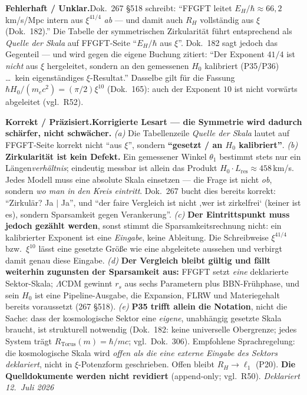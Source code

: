 \smallskip\noindent\textbf{Fehlerhaft / Unklar.}\quad Dok.~267 \S518 schreibt: \enquote{FFGFT leitet $E_H/\hbar \approx 66{,}2$\,km/s/Mpc intern aus $\xi^{41/4}$ \emph{ab} --- und damit auch $R_H$ vollständig aus $\xi$ (Dok.~182).} Die Tabelle der symmetrischen Zirkularität führt entsprechend als \emph{Quelle der Skala} auf FFGFT-Seite \enquote{$E_H/\hbar$ aus $\xi$}. Dok.~182 sagt jedoch das Gegenteil --- und wird gegen die eigene Buchung zitiert: \enquote{Der Exponent $41/4$ ist \emph{nicht} aus $\xi$ hergeleitet, sondern an den gemessenen $H_0$ kalibriert (P35/P36) \ldots\ kein eigenständiges $\xi$-Resultat.} Dasselbe gilt für die Fassung $\hbar H_0/(m_e c^2) = (\pi/2)\xi^{10}$ (Dok.~165): auch der Exponent $10$ ist nicht vorwärts abgeleitet (vgl.\ R52).


\smallskip\noindent\textbf{Korrekt / Präzisiert.}\quad \textbf{Korrigierte Lesart --- die Symmetrie wird dadurch schärfer, nicht schwächer.} \emph{(a)} Die Tabellenzeile \emph{Quelle der Skala} lautet auf FFGFT-Seite korrekt nicht \enquote{aus $\xi$}, sondern \textbf{\enquote{gesetzt / an $H_0$ kalibriert}}. \emph{(b)} \textbf{Zirkularität ist kein Defekt.} Ein gemessener Winkel $\theta_1$ bestimmt stets nur ein Längen\emph{verhältnis}; eindeutig messbar ist allein das Produkt $H_0\cdot L_\text{res} \approx 458$\,km/s. Jedes Modell muss eine absolute Skala einsetzen --- die Frage ist nicht \emph{ob}, sondern \emph{wo man in den Kreis eintritt}. Dok.~267 bucht dies bereits korrekt: \enquote{Zirkulär? Ja $|$ Ja}, und \enquote{der faire Vergleich ist nicht ,wer ist zirkelfrei` (keiner ist es), sondern Sparsamkeit gegen Verankerung}. \emph{(c)} \textbf{Der Eintrittspunkt muss jedoch gezählt werden}, sonst stimmt die Sparsamkeitsrechnung nicht: ein kalibrierter Exponent ist eine \emph{Eingabe}, keine Ableitung. Die Schreibweise $\xi^{41/4}$ bzw.\ $\xi^{10}$ lässt eine gesetzte Größe wie eine abgeleitete aussehen und verbirgt damit genau diese Eingabe. \emph{(d)} \textbf{Der Vergleich bleibt gültig und fällt weiterhin zugunsten der Sparsamkeit aus:} FFGFT setzt \emph{eine} deklarierte Sektor-Skala; $\Lambda$CDM gewinnt $r_s$ aus sechs Parametern plus BBN-Frühphase, und sein $H_0$ ist eine Pipeline-Ausgabe, die Expansion, FLRW und Materiegehalt bereits voraussetzt (267 \S518). \emph{(e)} \textbf{P35 trifft allein die Notation}, nicht die Sache: dass der kosmologische Sektor eine \emph{eigene}, unabhängig gesetzte Skala braucht, ist strukturell notwendig (Dok.~182: keine universelle Obergrenze; jedes System trägt $R_\text{Torus}(m)=\hbar/mc$; vgl.\ Dok.~306). Empfohlene Sprachregelung: die kosmologische Skala wird \emph{offen als die eine externe Eingabe des Sektors deklariert}, nicht in $\xi$-Potenzform geschrieben. Offen bleibt $R_H \to \ell_1$ (P20). \textbf{Die Quelldokumente werden nicht revidiert} (append-only; vgl.\ R50). \emph{Deklariert 12.~Juli 2026}


